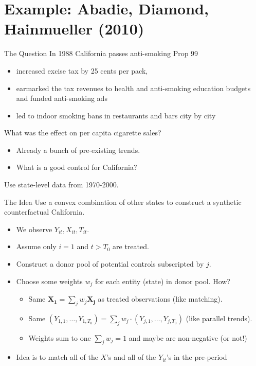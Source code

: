 \section{Example: Abadie, Diamond, Hainmueller (2010)}

\begin{frame}{The Question}
In 1988 California passes anti-smoking Prop 99
\begin{itemize}
\item increased excise tax by 25 cents per pack, 
\item earmarked the tax revenues to health and anti-smoking education budgets and funded anti-smoking ads
\item led to indoor smoking bans in restaurants and bars city by city
\end{itemize}
 What was the effect on per capita cigarette sales?
 \begin{itemize}
 \item Already a bunch of pre-existing trends.
 \item What is a good control for California?
 \end{itemize}
 Use state-level data from 1970-2000.
\end{frame}

\begin{frame}{The Idea}
Use a convex combination of other states to construct a \alert{synthetic counterfactual California}.\\
\begin{itemize}
\item We observe $Y_{it}, X_{it},T_{it}$.
\item Assume only $i=1$ and $t > T_0$ are \alert{treated}.
\item Construct a \alert{donor pool} of potential controls subscripted by $j$.
\item Choose some \alert{weights} $w_j$ for each entity (state) in donor pool. How?
\begin{itemize}
\item Same $\mathbf{X_{1}} = \sum_j w_j \mathbf{X_{j}}$ as treated observations (like matching).
\item Same $\left({Y_{1,1},\ldots, Y_{1,T_0}} \right)= \sum_j w_j \cdot \left({Y_{j,1},\ldots, Y_{j,T_0}} \right)$ (like parallel trends).
\item Weights sum to one $\sum_j w_j = 1$ and maybe are non-negative (or not!)
\end{itemize}
\item Idea is to match all of the $X$'s and all of the $Y_{it}$'s in the \alert{pre-period}
\end{itemize}
\end{frame}


